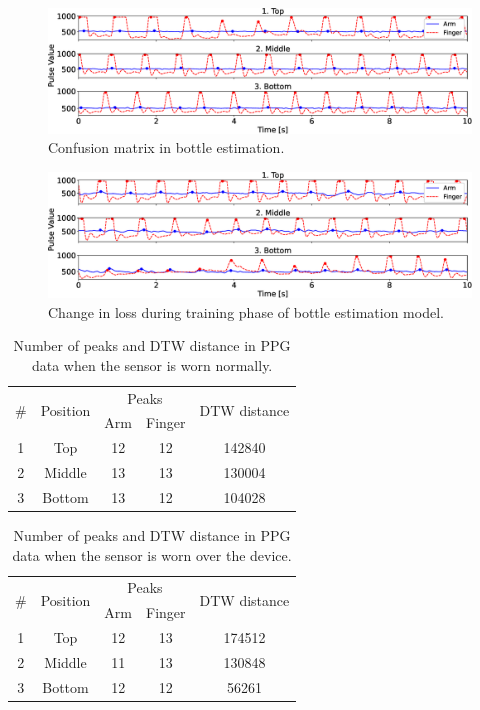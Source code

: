 \documentclass[sigconf]{acmart}
\begin{document}
\begin{figure}[!t]
  \centering
  \includegraphics[width=1\linewidth]{figures/manual.eps}
  \caption{Confusion matrix in bottle estimation.}
  \label{fig:manual}
\end{figure}

\begin{figure}[!t]
  \centering
  \includegraphics[width=1\linewidth]{figures/auto.eps}
  \caption{Change in loss during training phase of bottle estimation model.}
  \label{fig:auto}
\end{figure}

\begin{table}[!t]
  \small
  \centering
  \caption{Number of peaks and DTW distance in PPG data when the sensor is worn normally.}
  \begin{tabular}{c|c|cc|c} \hline\hline
    \multirow{2}{*}{\#} & \multirow{2}{*}{Position} & \multicolumn{2}{c|}{Peaks} & \multirow{2}{*}{DTW distance} \\ \cline{3-4}
     &                   & Arm & Finger & \\ \hline
    1 & Top & 12 & 12 & 142840 \\
    2 & Middle & 13 & 13 & 130004 \\
    3 & Bottom & 13 & 12 & 104028 \\ \hline
  \end{tabular}
  \label{tab:manual}
\end{table}

\begin{table}[!t]
  \small
  \centering
  \caption{Number of peaks and DTW distance in PPG data when the sensor is worn over the device.}
  \begin{tabular}{c|c|cc|c} \hline\hline
    \multirow{2}{*}{\#} & \multirow{2}{*}{Position} & \multicolumn{2}{c|}{Peaks} & \multirow{2}{*}{DTW distance} \\ \cline{3-4}
     &                   & Arm & Finger & \\ \hline
    1 & Top & 12 & 13 & 174512 \\
    2 & Middle & 11 & 13 & 130848 \\
    3 & Bottom & 12 & 12 & 56261 \\ \hline
  \end{tabular}
  \label{tab:auto}
\end{table}
\end{document}
